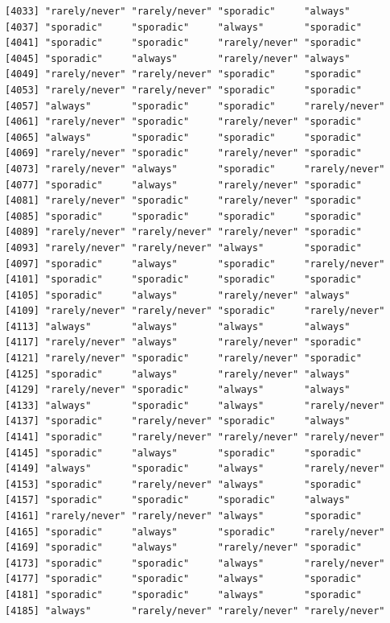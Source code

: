\documentclass[
  letterpaper,
  DIV=11,
  numbers=noendperiod]{scrartcl}
\begin{document}
\begin{verbatim}
[4033] "rarely/never" "rarely/never" "sporadic"     "always"      
[4037] "sporadic"     "sporadic"     "always"       "sporadic"    
[4041] "sporadic"     "sporadic"     "rarely/never" "sporadic"    
[4045] "sporadic"     "always"       "rarely/never" "always"      
[4049] "rarely/never" "rarely/never" "sporadic"     "sporadic"    
[4053] "rarely/never" "rarely/never" "sporadic"     "sporadic"    
[4057] "always"       "sporadic"     "sporadic"     "rarely/never"
[4061] "rarely/never" "sporadic"     "rarely/never" "sporadic"    
[4065] "always"       "sporadic"     "sporadic"     "sporadic"    
[4069] "rarely/never" "sporadic"     "rarely/never" "sporadic"    
[4073] "rarely/never" "always"       "sporadic"     "rarely/never"
[4077] "sporadic"     "always"       "rarely/never" "sporadic"    
[4081] "rarely/never" "sporadic"     "rarely/never" "sporadic"    
[4085] "sporadic"     "sporadic"     "sporadic"     "sporadic"    
[4089] "rarely/never" "rarely/never" "rarely/never" "sporadic"    
[4093] "rarely/never" "rarely/never" "always"       "sporadic"    
[4097] "sporadic"     "always"       "sporadic"     "rarely/never"
[4101] "sporadic"     "sporadic"     "sporadic"     "sporadic"    
[4105] "sporadic"     "always"       "rarely/never" "always"      
[4109] "rarely/never" "rarely/never" "sporadic"     "rarely/never"
[4113] "always"       "always"       "always"       "always"      
[4117] "rarely/never" "always"       "rarely/never" "sporadic"    
[4121] "rarely/never" "sporadic"     "rarely/never" "sporadic"    
[4125] "sporadic"     "always"       "rarely/never" "always"      
[4129] "rarely/never" "sporadic"     "always"       "always"      
[4133] "always"       "sporadic"     "always"       "rarely/never"
[4137] "sporadic"     "rarely/never" "sporadic"     "always"      
[4141] "sporadic"     "rarely/never" "rarely/never" "rarely/never"
[4145] "sporadic"     "always"       "sporadic"     "sporadic"    
[4149] "always"       "sporadic"     "always"       "rarely/never"
[4153] "sporadic"     "rarely/never" "always"       "sporadic"    
[4157] "sporadic"     "sporadic"     "sporadic"     "always"      
[4161] "rarely/never" "rarely/never" "always"       "sporadic"    
[4165] "sporadic"     "always"       "sporadic"     "rarely/never"
[4169] "sporadic"     "always"       "rarely/never" "sporadic"    
[4173] "sporadic"     "sporadic"     "always"       "rarely/never"
[4177] "sporadic"     "sporadic"     "always"       "sporadic"    
[4181] "sporadic"     "sporadic"     "always"       "sporadic"    
[4185] "always"       "rarely/never" "rarely/never" "rarely/never"

\end{verbatim}
\end{document}
